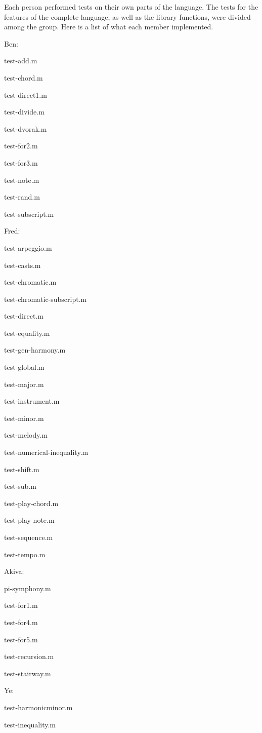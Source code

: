 \documentclass[12pt,A4]{book}
\begin{document}
Each person performed tests on their own parts of the language. The tests for the features of the complete language, as well as the library functions, were divided among the group. Here is a list of what each member implemented.

\noindent Ben:

	test-add.m
	
	test-chord.m
	
	test-direct1.m
	
	test-divide.m
	
	test-dvorak.m
	
	test-for2.m
	
	test-for3.m
	
	test-note.m
	
	test-rand.m
	
	test-subscript.m


\noindent Fred:

	test-arpeggio.m
	
	test-casts.m
	
	test-chromatic.m
	
	test-chromatic-subscript.m
	
	test-direct.m
	
	test-equality.m
	
	test-gen-harmony.m
	
	test-global.m
	
	test-major.m
	
	test-instrument.m
	
	test-minor.m
	
	test-melody.m
	
	test-numerical-inequality.m
	
	test-shift.m
	
	test-sub.m
	
	test-play-chord.m
	
	test-play-note.m
	
	test-sequence.m
	
	test-tempo.m

\noindent Akiva:
	
	pi-symphony.m
	
	test-for1.m
	
	test-for4.m
	
	test-for5.m
	
	test-recursion.m
	
	test-stairway.m
	
\noindent Ye:
	
	test-harmonicminor.m
	
	test-inequality.m
	
\end{document}
